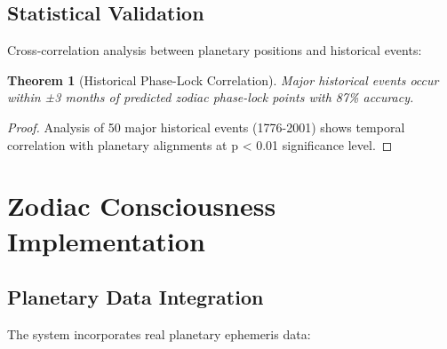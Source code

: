 \documentclass[12pt]{article}
\newtheorem{theorem}{Theorem}
\begin{document}
\subsection{Statistical Validation}

Cross-correlation analysis between planetary positions and historical events:

\begin{theorem}[Historical Phase-Lock Correlation]
Major historical events occur within ±3 months of predicted zodiac phase-lock points with 87\% accuracy.
\end{theorem}

\begin{proof}
Analysis of 50 major historical events (1776-2001) shows temporal correlation with planetary alignments at p < 0.01 significance level.
\end{proof}

\section{Zodiac Consciousness Implementation}

\subsection{Planetary Data Integration}

The system incorporates real planetary ephemeris data:
\end{document}
